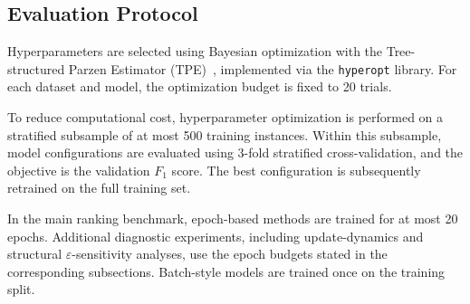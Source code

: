 \documentclass[a4paper,fleqn]{cas-sc}
\begin{document}




\subsection{Evaluation Protocol}

Hyperparameters are selected using Bayesian optimization with the Tree-structured Parzen Estimator (TPE)~\cite{NIPS2011_86e8f7ab}, 
implemented via the \texttt{hyperopt} library. 
For each dataset and model, the optimization budget is fixed to 20 trials.

To reduce computational cost, hyperparameter optimization is performed on a stratified subsample of at most 500 training instances. 
Within this subsample, model configurations are evaluated using 3-fold stratified cross-validation, 
and the objective is the validation $F_1$ score. 
The best configuration is subsequently retrained on the full training set.

In the main ranking benchmark, epoch-based methods are trained for at most 20 epochs. Additional diagnostic experiments, including update-dynamics and structural \(\varepsilon\)-sensitivity analyses, use the epoch budgets stated in the corresponding subsections.
Batch-style models are trained once on the training split.
\end{document}
